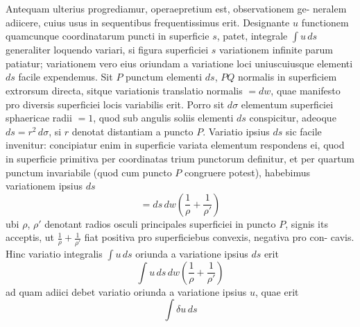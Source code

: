 \documentclass[12pt,a4paper]{article}
\theoremstyle{gauss}
\begin{document}
Antequam ulterius progrediamur, operaepretium est, observationem ge-
neralem adiicere, cuius usus in sequentibus frequentissimus erit. Designante $u$
functionem quamcunque coordinatarum puncti in superficie $s$, patet, integrale
$\int u\,ds$ generaliter loquendo variari, si figura superficiei $s$ variationem infinite
parum patiatur; variationem vero eius oriundam a variatione loci uniuscuiusque
elementi $ds$ facile expendemus. Sit $P$ punctum elementi $ds$, $PQ$ normalis in
superficiem extrorsum directa, sitque variationis translatio normalis $=dw$, quae
manifesto pro diversis superficiei locis variabilis erit. Porro sit $d\sigma$ elementum
superficiei sphaericae radii $=1$, quod sub angulis soliis elementi $ds$ conspicitur,
adeoque $ds = r^2\,d\sigma$, si $r$ denotat distantiam a puncto $P$. Variatio ipsius $ds$
sic facile invenitur: concipiatur enim in superficie variata elementum respondens
ei, quod in superficie primitiva per coordinatas trium punctorum definitur, et per
quartum punctum invariabile (quod cum puncto $P$ congruere potest), habebimus
variationem ipsius $ds$
\[
= ds\,dw\left(\frac{1}{\rho} + \frac{1}{\rho'}\right)
\]
ubi $\rho$, $\rho'$ denotant radios osculi principales superficiei in puncto $P$, signis its
acceptis, ut $\frac{1}{\rho} + \frac{1}{\rho'}$ fiat positiva pro superficiebus convexis, negativa pro con-
cavis. Hinc variatio integralis $\int u\,ds$ oriunda a variatione ipsius $ds$ erit
\[
\int u\,ds\,dw\left(\frac{1}{\rho} + \frac{1}{\rho'}\right)
\]
ad quam adiici debet variatio oriunda a variatione ipsius $u$, quae erit
\[
\int \delta u\,ds
\]
\end{document}
